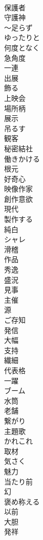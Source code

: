 \documentclass[8pt]{extreport}
\begin{document}
\begin{CJK}{UTF8}{min}
\\	保護者
\\	守護神
\\	～足らず
\\	ゆったりと
\\	何度となく
\\	急角度
\\	一連
\\	出展
\\	飾る
\\	上映会
\\	場所柄
\\	展示
\\	吊るす
\\	観客
\\	秘密結社
\\	働きかける
\\	根元
\\	好奇心
\\	映像作家
\\	創作意欲
\\	現代
\\	製作する
\\	純白
\\	シャレ
\\	滑稽
\\	作品
\\	秀逸
\\	盛況
\\	見事
\\	主催
\\	源
\\	ご存知
\\	発信
\\	大幅
\\	支持
\\	繊細
\\	代表格
\\	一躍
\\	ブーム
\\	水筒
\\	老舗
\\	繋がり
\\	主題歌
\\	かれこれ
\\	取材
\\	気さく
\\	魅力
\\	当たり前
\\	幻
\\	褒め称える
\\	以前
\\	大胆
\\	発祥

\end{CJK}
\end{document}
